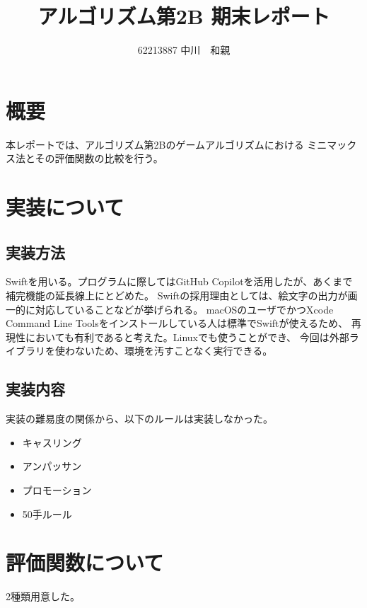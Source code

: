 \documentclass[12pt, a4paper, uplatex]{jsarticle}
\title{アルゴリズム第2B 期末レポート}
\author{62213887 中川　和親}
\begin{document}
\maketitle

\section{概要}
本レポートでは、アルゴリズム第2Bのゲームアルゴリズムにおける
ミニマックス法とその評価関数の比較を行う。

\section{実装について}
\subsection{実装方法}
Swiftを用いる。プログラムに際してはGitHub Copilotを活用したが、あくまで補完機能の延長線上にとどめた。
Swiftの採用理由としては、絵文字の出力が画一的に対応していることなどが挙げられる。
macOSのユーザでかつXcode Command Line Toolsをインストールしている人は標準でSwiftが使えるため、
再現性においても有利であると考えた。Linuxでも使うことができ、
今回は外部ライブラリを使わないため、環境を汚すことなく実行できる。

\subsection{実装内容}
実装の難易度の関係から、以下のルールは実装しなかった。
\begin{itemize}
  \item キャスリング
  \item アンパッサン
  \item プロモーション
  \item 50手ルール
\end{itemize}

\section{評価関数について}
2種類用意した。
\end{document}
